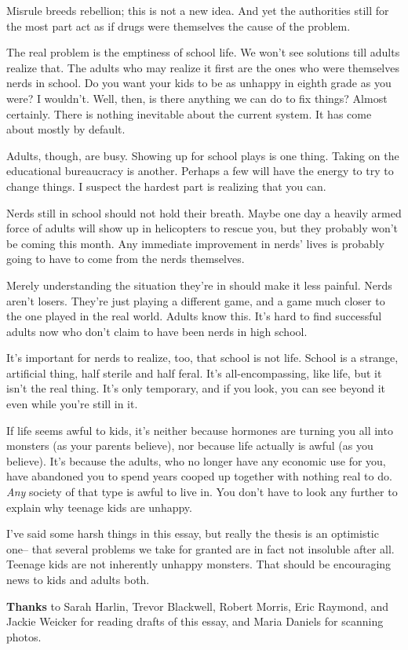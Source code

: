 Misrule breeds rebellion; this is not a new idea. And yet the
authorities still for the most part act as if drugs were themselves the
cause of the problem.

The real problem is the emptiness of school life. We won't see solutions
till adults realize that. The adults who may realize it first are the
ones who were themselves nerds in school. Do you want your kids to be as
unhappy in eighth grade as you were? I wouldn't. Well, then, is there
anything we can do to fix things? Almost certainly. There is nothing
inevitable about the current system. It has come about mostly by
default.

Adults, though, are busy. Showing up for school plays is one thing.
Taking on the educational bureaucracy is another. Perhaps a few will
have the energy to try to change things. I suspect the hardest part is
realizing that you can.

Nerds still in school should not hold their breath. Maybe one day a
heavily armed force of adults will show up in helicopters to rescue you,
but they probably won't be coming this month. Any immediate improvement
in nerds' lives is probably going to have to come from the nerds
themselves.

Merely understanding the situation they're in should make it less
painful. Nerds aren't losers. They're just playing a different game, and
a game much closer to the one played in the real world. Adults know
this. It's hard to find successful adults now who don't claim to have
been nerds in high school.

It's important for nerds to realize, too, that school is not life.
School is a strange, artificial thing, half sterile and half feral. It's
all-encompassing, like life, but it isn't the real thing. It's only
temporary, and if you look, you can see beyond it even while you're
still in it.

If life seems awful to kids, it's neither because hormones are turning
you all into monsters (as your parents believe), nor because life
actually is awful (as you believe). It's because the adults, who no
longer have any economic use for you, have abandoned you to spend years
cooped up together with nothing real to do. \emph{Any} society of that
type is awful to live in. You don't have to look any further to explain
why teenage kids are unhappy.

I've said some harsh things in this essay, but really the thesis is an
optimistic one-- that several problems we take for granted are in fact
not insoluble after all. Teenage kids are not inherently unhappy
monsters. That should be encouraging news to kids and adults both.

\textbf{Thanks} to Sarah Harlin, Trevor Blackwell, Robert Morris, Eric
Raymond, and Jackie Weicker for reading drafts of this essay, and Maria
Daniels for scanning photos.